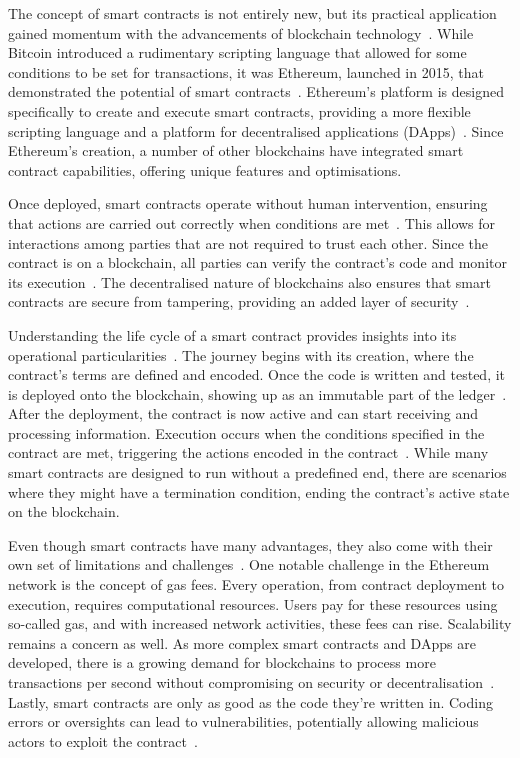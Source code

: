 The concept of smart contracts is not entirely new, but its practical application gained momentum with the advancements of blockchain technology~\cite{Pierro.}. While Bitcoin introduced a rudimentary scripting language that allowed for some conditions to be set for transactions, it was Ethereum, launched in 2015, that demonstrated the potential of smart contracts~\cite{Pierro.}. Ethereum's platform is designed specifically to create and execute smart contracts, providing a more flexible scripting language and a platform for decentralised applications (DApps)~\cite{Pierro.}. Since Ethereum's creation, a number of other blockchains have integrated smart contract capabilities, offering unique features and optimisations.

Once deployed, smart contracts operate without human intervention, ensuring that actions are carried out correctly when conditions are met~\cite{UchaniGutierrez.2023}. This allows for interactions among parties that are not required to trust each other. Since the contract is on a blockchain, all parties can verify the contract's code and monitor its execution~\cite{UchaniGutierrez.2023}. The decentralised nature of blockchains also ensures that smart contracts are secure from tampering, providing an added layer of security~\cite{Zhou.2022}.

Understanding the life cycle of a smart contract provides insights into its operational particularities~\cite{Pierro.}. The journey begins with its creation, where the contract's terms are defined and encoded. Once the code is written and tested, it is deployed onto the blockchain, showing up as an immutable part of the ledger~\cite{Pierro.}. After the deployment, the contract is now active and can start receiving and processing information. Execution occurs when the conditions specified in the contract are met, triggering the actions encoded in the contract~\cite{Pierro.}. While many smart contracts are designed to run without a predefined end, there are scenarios where they might have a termination condition, ending the contract's active state on the blockchain.

Even though smart contracts have many advantages, they also come with their own set of limitations and challenges~\cite{.2019}. One notable challenge in the Ethereum network is the concept of gas fees. Every operation, from contract deployment to execution, requires computational resources. Users pay for these resources using so-called gas, and with increased network activities, these fees can rise. Scalability remains a concern as well. As more complex smart contracts and DApps are developed, there is a growing demand for blockchains to process more transactions per second without compromising on security or decentralisation~\cite{.2019}. Lastly, smart contracts are only as good as the code they're written in. Coding errors or oversights can lead to vulnerabilities, potentially allowing malicious actors to exploit the contract~\cite{Zhou.2022}.

